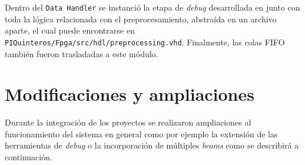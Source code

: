 \documentclass[../../main.tex]{subfiles}
\begin{document}
\begin{table}[H]
    \centering
    \caption{Asignación de canales de datos del \texttt{Data Handler} a partir de la salida de ambas instancias del \texttt{ADC Receiver}.}\label{tab::reordenamiento-adc-receivers}
    \end{table}

Dentro del \texttt{Data Handler} se instanció la etapa de \textit{debug} desarrollada en \cite{proyecto-jose} junto con toda la lógica relacionada con el preprocesamiento, abstraída en un archivo aparte, el cual puede encontrarse en \texttt{PIQuinteros/Fpga/src/hdl/preprocessing.vhd}. Finalmente, las colas FIFO también fueron trasladadas a este módulo.

\section{Modificaciones y ampliaciones}
Durante la integración de los proyectos se realizaron ampliaciones al funcionamiento del sistema en general como por ejemplo la extensión de las herramientas de \textit{debug} o la incorporación de múltiples \textit{beams} como se describirá a continuación.
\end{document}
